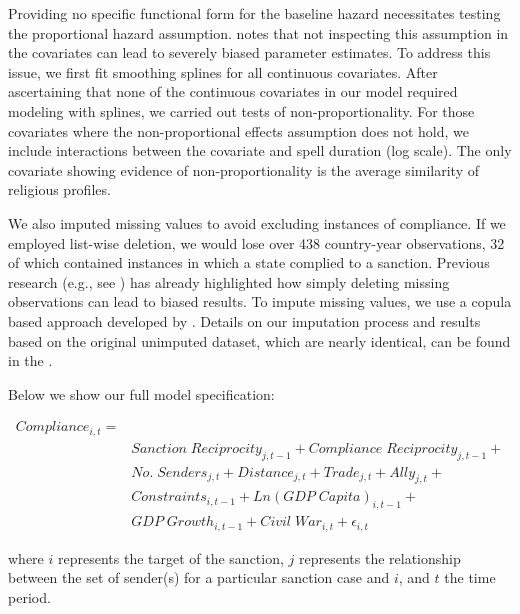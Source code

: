 Providing no specific functional form for the baseline hazard necessitates testing the proportional hazard assumption. \citet{keele2010proportionally} notes that not inspecting this assumption in the covariates can lead to severely biased parameter estimates. To address this issue, we first fit smoothing splines for all continuous covariates. After ascertaining that none of the continuous covariates in our model required modeling with splines, we carried out tests of non-proportionality. For those covariates where the non-proportional effects assumption does not hold, we include interactions between the covariate and spell duration (log scale). The only covariate showing evidence of non-proportionality is the average similarity of religious profiles.

We also imputed missing values to avoid excluding instances of compliance. If we employed list-wise deletion, we would lose over 438 country-year observations, 32 of which contained instances in which a state complied to a sanction. Previous research (e.g., see \citealp{rubin1976inference,honaker2010missing}) has already highlighted how simply deleting missing observations can lead to biased results. To impute missing values, we use a copula based approach developed by \citet{hoff:2007}. Details on our imputation process and results based on the original unimputed dataset, which are nearly identical, can be found in the . 

Below we show our full model specification: 

\begin{align*}
		Compliance_{i,t} =& \\
		&Sanction \; Reciprocity_{j,t-1} + Compliance \; Reciprocity_{j,t-1} + \\
		&No. \; Senders_{j,t} + Distance_{j,t} + Trade_{j,t} + Ally_{j,t} + \\
		&Constraints_{i,t-1} + Ln(GDP \; Capita)_{i,t-1} +\\
		&GDP \; Growth_{i,t-1} + Civil \; War_{i,t} + \epsilon_{i,t}
\end{align*}

where $i$ represents the target of the sanction, $j$ represents the relationship between the set of sender(s) for a particular sanction case and $i$, and $t$ the time period.